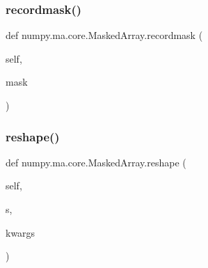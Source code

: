 \subsubsection{\texorpdfstring{recordmask()}{recordmask()}\hspace{0.1cm}{\footnotesize\ttfamily [2/2]}}
{\footnotesize\ttfamily def numpy.\+ma.\+core.\+Masked\+Array.\+recordmask (\begin{DoxyParamCaption}\item[{}]{self,  }\item[{}]{mask }\end{DoxyParamCaption})}

\mbox{\label{classnumpy_1_1ma_1_1core_1_1MaskedArray_a7d038e870209e021ece2e5b14bfe7f2c}} 
\subsubsection{\texorpdfstring{reshape()}{reshape()}}
{\footnotesize\ttfamily def numpy.\+ma.\+core.\+Masked\+Array.\+reshape (\begin{DoxyParamCaption}\item[{}]{self,  }\item[{}]{s,  }\item[{}]{kwargs }\end{DoxyParamCaption})}

